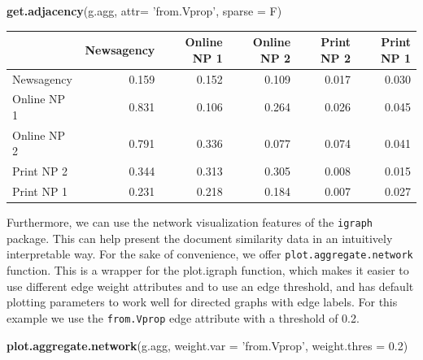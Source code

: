 \documentclass[]{article}
\newenvironment{Shaded}{\begin{snugshade}}{\end{snugshade}}
\newcommand{\KeywordTok}[1]{\textcolor[rgb]{0.13,0.29,0.53}{\textbf{{#1}}}}
\newcommand{\DataTypeTok}[1]{\textcolor[rgb]{0.13,0.29,0.53}{{#1}}}
\newcommand{\FloatTok}[1]{\textcolor[rgb]{0.00,0.00,0.81}{{#1}}}
\newcommand{\StringTok}[1]{\textcolor[rgb]{0.31,0.60,0.02}{{#1}}}
\newcommand{\NormalTok}[1]{{#1}}
\begin{document}
\begin{Shaded}
\begin{Highlighting}[]
\KeywordTok{get.adjacency}\NormalTok{(g.agg, }\DataTypeTok{attr=} \StringTok{'from.Vprop'}\NormalTok{, }\DataTypeTok{sparse =} \NormalTok{F)}
\end{Highlighting}
\end{Shaded}

\begin{longtable}[c]{@{}lrrrrr@{}}
\toprule
& Newsagency & Online NP 1 & Online NP 2 & Print NP 2 & Print NP
1\tabularnewline
\midrule
\endhead
Newsagency & 0.159 & 0.152 & 0.109 & 0.017 & 0.030\tabularnewline
Online NP 1 & 0.831 & 0.106 & 0.264 & 0.026 & 0.045\tabularnewline
Online NP 2 & 0.791 & 0.336 & 0.077 & 0.074 & 0.041\tabularnewline
Print NP 2 & 0.344 & 0.313 & 0.305 & 0.008 & 0.015\tabularnewline
Print NP 1 & 0.231 & 0.218 & 0.184 & 0.007 & 0.027\tabularnewline
\bottomrule
\end{longtable}

Furthermore, we can use the network visualization features of the
\texttt{igraph} package. This can help present the document similarity
data in an intuitively interpretable way. For the sake of convenience,
we offer \texttt{plot.aggregate.network} function. This is a wrapper for
the plot.igraph function, which makes it easier to use different edge
weight attributes and to use an edge threshold, and has default plotting
parameters to work well for directed graphs with edge labels. For this
example we use the \texttt{from.Vprop} edge attribute with a threshold
of 0.2.

\begin{Shaded}
\begin{Highlighting}[]
\KeywordTok{plot.aggregate.network}\NormalTok{(g.agg, }\DataTypeTok{weight.var =} \StringTok{'from.Vprop'}\NormalTok{,}
                       \DataTypeTok{weight.thres =} \FloatTok{0.2}\NormalTok{)}
\end{Highlighting}
\end{Shaded}
\end{document}
